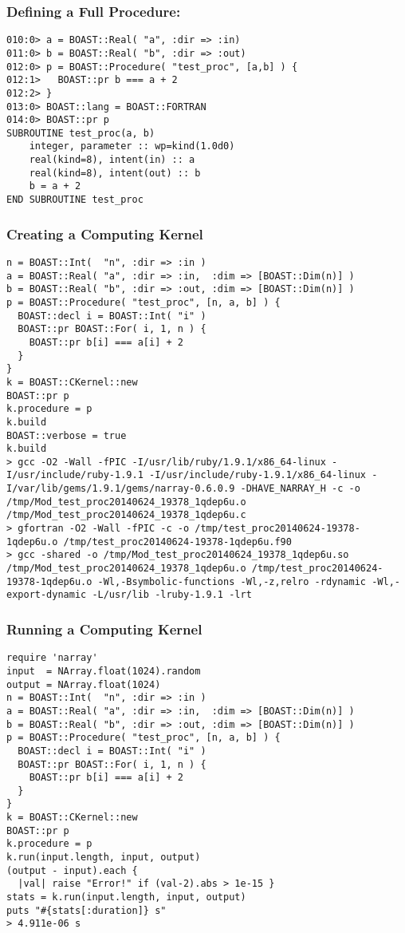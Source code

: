 \documentclass{beamer}
\begin{document}
\begin{frame}[fragile]
\frametitle{Defining a Full Procedure:}
\lstset{style=BOAST}
\tiny
\begin{lstlisting}
010:0> a = BOAST::Real( "a", :dir => :in)
011:0> b = BOAST::Real( "b", :dir => :out)
012:0> p = BOAST::Procedure( "test_proc", [a,b] ) {
012:1>   BOAST::pr b === a + 2
012:2> }
013:0> BOAST::lang = BOAST::FORTRAN
014:0> BOAST::pr p
SUBROUTINE test_proc(a, b)
    integer, parameter :: wp=kind(1.0d0)
    real(kind=8), intent(in) :: a
    real(kind=8), intent(out) :: b
    b = a + 2
END SUBROUTINE test_proc
\end{lstlisting}
\end{frame}

\begin{frame}[fragile]
\frametitle{Creating a Computing Kernel}
\lstset{style=BOAST}
\tiny
\begin{lstlisting}
n = BOAST::Int(  "n", :dir => :in )
a = BOAST::Real( "a", :dir => :in,  :dim => [BOAST::Dim(n)] )
b = BOAST::Real( "b", :dir => :out, :dim => [BOAST::Dim(n)] )
p = BOAST::Procedure( "test_proc", [n, a, b] ) {
  BOAST::decl i = BOAST::Int( "i" )
  BOAST::pr BOAST::For( i, 1, n ) {
    BOAST::pr b[i] === a[i] + 2
  }
}
k = BOAST::CKernel::new
BOAST::pr p
k.procedure = p
k.build
BOAST::verbose = true
k.build
> gcc -O2 -Wall -fPIC -I/usr/lib/ruby/1.9.1/x86_64-linux -I/usr/include/ruby-1.9.1 -I/usr/include/ruby-1.9.1/x86_64-linux -I/var/lib/gems/1.9.1/gems/narray-0.6.0.9 -DHAVE_NARRAY_H -c -o /tmp/Mod_test_proc20140624_19378_1qdep6u.o /tmp/Mod_test_proc20140624_19378_1qdep6u.c
> gfortran -O2 -Wall -fPIC -c -o /tmp/test_proc20140624-19378-1qdep6u.o /tmp/test_proc20140624-19378-1qdep6u.f90
> gcc -shared -o /tmp/Mod_test_proc20140624_19378_1qdep6u.so /tmp/Mod_test_proc20140624_19378_1qdep6u.o /tmp/test_proc20140624-19378-1qdep6u.o -Wl,-Bsymbolic-functions -Wl,-z,relro -rdynamic -Wl,-export-dynamic -L/usr/lib -lruby-1.9.1 -lrt
\end{lstlisting}
\end{frame}

\begin{frame}[fragile]
\frametitle{Running a Computing Kernel}
\lstset{style=BOAST}
\tiny
\begin{lstlisting}
require 'narray'
input  = NArray.float(1024).random
output = NArray.float(1024)
n = BOAST::Int(  "n", :dir => :in )
a = BOAST::Real( "a", :dir => :in,  :dim => [BOAST::Dim(n)] )
b = BOAST::Real( "b", :dir => :out, :dim => [BOAST::Dim(n)] )
p = BOAST::Procedure( "test_proc", [n, a, b] ) {
  BOAST::decl i = BOAST::Int( "i" )
  BOAST::pr BOAST::For( i, 1, n ) {
    BOAST::pr b[i] === a[i] + 2
  }
}
k = BOAST::CKernel::new
BOAST::pr p
k.procedure = p
k.run(input.length, input, output)
(output - input).each {
  |val| raise "Error!" if (val-2).abs > 1e-15 }
stats = k.run(input.length, input, output)
puts "#{stats[:duration]} s"
> 4.911e-06 s
\end{lstlisting}
\end{frame}
\end{document}
